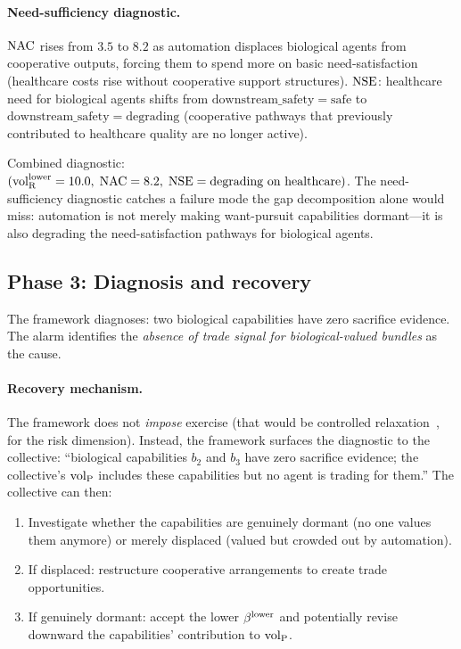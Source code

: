 \paragraph{Need-sufficiency diagnostic.}
$\mathrm{NAC}$ rises from $3.5$ to $8.2$ as automation displaces
biological agents from cooperative outputs, forcing them to spend
more on basic need-satisfaction (healthcare costs rise without
cooperative support structures).  $\mathrm{NSE}$: healthcare need for
biological agents shifts from
$\mathrm{downstream\_safety} = \mathrm{safe}$ to
$\mathrm{downstream\_safety} = \mathrm{degrading}$ (cooperative
pathways that previously contributed to healthcare quality are no
longer active).

Combined diagnostic: $({\operatorname{vol}_{\mathrm{R}}^{\mathrm{lower}}} = 10.0,\; \mathrm{NAC} = 8.2,\;
\mathrm{NSE} = \text{degrading on healthcare})$.  The need-sufficiency
diagnostic catches a failure mode the gap decomposition alone
would miss: automation is not merely making want-pursuit
capabilities dormant---it is also degrading the need-satisfaction
pathways for biological agents.

\subsection{Phase 3: Diagnosis and recovery}

The framework diagnoses: two biological capabilities have zero
sacrifice evidence.  The alarm identifies the \emph{absence of
trade signal for biological-valued bundles} as the cause.

\paragraph{Recovery mechanism.}
The framework does not \emph{impose} exercise (that would be
controlled relaxation~\citep{lasser2026wamura}, for the risk
dimension).  Instead, the framework surfaces the diagnostic to the
collective: ``biological capabilities $b_2$ and $b_3$ have zero
sacrifice evidence; the collective's ${\operatorname{vol}_{\mathrm{P}}}$ includes these
capabilities but no agent is trading for them.''  The collective
can then:
\begin{enumerate}
\item[(a)] Investigate whether the capabilities are genuinely
  dormant (no one values them anymore) or merely displaced (valued
  but crowded out by automation).
\item[(b)] If displaced: restructure cooperative arrangements to
  create trade opportunities.
\item[(c)] If genuinely dormant: accept the lower $\beta^{\mathrm{lower}}$ and
  potentially revise downward the capabilities' contribution to
  ${\operatorname{vol}_{\mathrm{P}}}$.
\end{enumerate}

